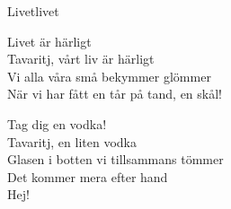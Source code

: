 \begin{song}{Livet}{livet}
\begin{vers}
\repopen Livet är härligt\\
Tavaritj, vårt liv är härligt\\
Vi alla våra små bekymmer glömmer\\
När vi har fått en tår på tand, en skål!\\
\end{vers}
\begin{vers}
Tag dig en vodka!\\
Tavaritj, en liten vodka\\
Glasen i botten vi tillsammans tömmer\\
Det kommer mera efter hand \repclose\\
Hej!\\
\end{vers}
\end{song}
